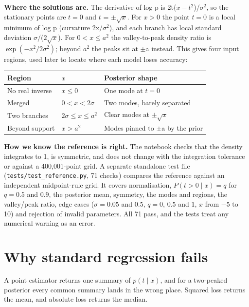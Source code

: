 \documentclass[11pt,a4paper]{article}
\begin{document}
\textbf{Where the solutions are.} The derivative of log p is 2t($x - t^{2}$)/$\sigma ^{2}$, so the stationary points are $t = 0$ and $t$ = $\pm \sqrt{x}$. For $x > 0$ the point $t = 0$ is a local minimum of log p (curvature 2x/$\sigma ^{2}$), and each branch has local standard deviation $\sigma$/($2\sqrt{x}$). For $0 < x \le  a^{2}$ the valley-to-peak density ratio is $\exp(-x^{2}/2\sigma ^{2})$; beyond $a^{2}$ the peaks sit at $\pm$a instead. This gives four input regions, used later to locate where each model loses accuracy:

\begin{table}[H]
\centering\small
\begin{tabularx}{\linewidth}{ll>{\raggedright\arraybackslash}X}
\toprule
\textbf{Region} & \textbf{$x$} & \textbf{Posterior shape} \\
\midrule
No real inverse & $x \le  0$ & One mode at $t = 0$ \\
Merged & $0 < x < 2\sigma$ & Two modes, barely separated \\
Two branches & $2\sigma  \le  x \le  a^{2}$ & Clear modes at $\pm \sqrt{x}$ \\
Beyond support & $x > a^{2}$ & Modes pinned to $\pm$a by the prior \\
\bottomrule
\end{tabularx}
\end{table}

\textbf{How we know the reference is right.} The notebook checks that the density integrates to 1, is symmetric, and does not change with the integration tolerance or against a 400,001-point grid. A separate standalone test file (\texttt{tests/\allowbreak{}test\_\allowbreak{}reference.py}, 71 checks) compares the reference against an independent midpoint-rule grid. It covers normalisation, $P(t > 0 \mid  x) = q$ for $q = 0.5$ and 0.9, the posterior mean, symmetry, the modes and regions, the valley/peak ratio, edge cases ($\sigma  = 0.05$ and 0.5, $q = 0$, 0.5 and 1, $x$ from $-$5 to 10) and rejection of invalid parameters. All 71 pass, and the tests treat any numerical warning as an error.

\section{Why standard regression fails}
A point estimator returns one summary of $p(t \mid  x)$, and for a two-peaked posterior every common summary lands in the wrong place. Squared loss returns the mean, and absolute loss returns the median.
\end{document}

